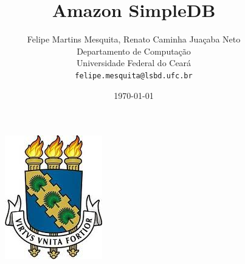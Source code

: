\begin{figure}[t!]
  \centering
    \includegraphics[scale=0.25]{figuras/ufc_brasao.jpg}
\end{figure}
\title{Amazon SimpleDB}
\author{Felipe Martins Mesquita, Renato Caminha Juaçaba Neto\\
		Departamento de Computação\\
		Universidade Federal do Ceará\\
		\texttt{felipe.mesquita@lsbd.ufc.br}}
\date{\today}
\maketitle